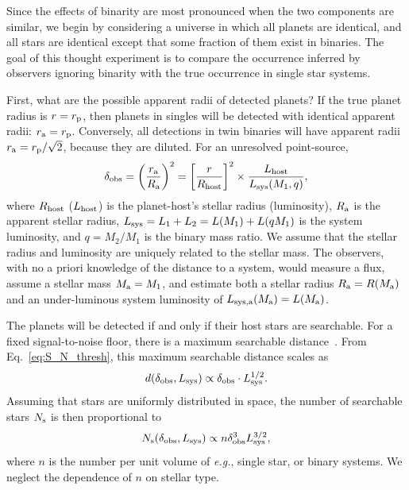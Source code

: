 \documentclass[12pt,modern]{aastex61}
\renewcommand{\a}{_{\rm a}}
\newcommand{\s}{_{\rm s}}
\newcommand{\p}{_{\rm p}}
\begin{document}
Since the effects of binarity are most pronounced when the two components are 
similar, we begin by considering a universe in which all planets are 
identical, and all stars are identical except that some fraction of them exist 
in binaries. The goal of this thought experiment is to compare the occurrence 
inferred by observers ignoring binarity with the true occurrence in single 
star systems.

First, what are the possible apparent radii of detected planets?
If the true planet radius is $r=r\p$, then planets in singles will be 
detected with identical apparent radii: $r\a = r\p$.
Conversely, all detections in twin binaries will have apparent radii 
$r\a=r\p/\sqrt{2}$, because they are diluted.
For an unresolved point-source,
\begin{equation}
\delta_{\rm obs}
= \left(\frac{r\a}{R\a}\right)^2
= \left[{r\over R_{\rm host}}\right]^2\times {L_{\rm host} \over L_{\rm 
        sys}(M_1, q)},
\label{eq:delta_obs_general} 
\end{equation}
where $R_{\rm host}$ ($L_{\rm host}$) is the planet-host's stellar radius 
(luminosity), $R\a$ is the apparent stellar radius, $L_{\rm sys}=L_1+L_2 = 
L(M_1) + L(qM_1)$ is the system luminosity, and $q=M_2/M_1$ is the binary mass 
ratio.
We assume that the stellar radius and luminosity are uniquely related to the 
stellar mass.
The observers, with no a priori knowledge of the distance to a system, would 
measure a flux, assume a stellar mass $M\a=M_1$, and estimate both a stellar 
radius $R\a = R(M\a)$ and an under-luminous system luminosity of $L_{\rm 
sys,a}(M\a) = L(M\a)$.

The planets will be detected if and only if their host stars are searchable.
For a fixed signal-to-noise floor, there is a maximum searchable 
distance~\citep{pepper_using_2003,pepper_searching_2005}.
From Eq.~\ref{eq:S_N_thresh}, this maximum searchable distance scales as
\begin{equation}
d(\delta_{\rm obs}, L_{\rm sys}) \propto \delta_{\rm obs} \cdot L_{\rm 
    sys}^{1/2}.
\end{equation}
Assuming that stars are uniformly distributed in space, the number 
of searchable stars $N\s$ is then proportional to
\begin{equation}
N\s(\delta_{\rm obs}, L_{\rm sys}) \propto n \delta_{\rm obs}^3 L_{\rm 
    sys}^{3/2},
\label{eq:N_searchable_prop}
\end{equation}
where $n$ is the number per unit volume of {\it e.g.}, single star, or binary 
systems.
We neglect the dependence of $n$ on stellar type.
\end{document}
